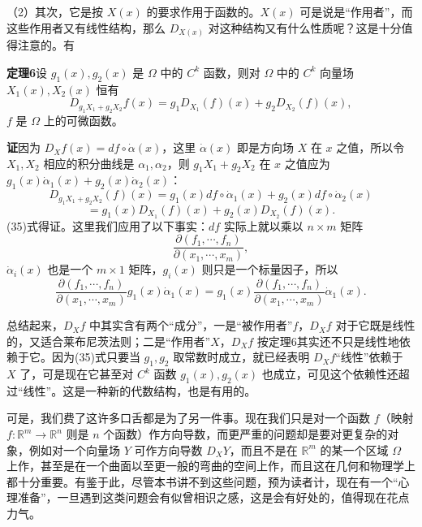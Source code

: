 （2）其次，它是按 $X(x)$ 的要求作用于函数的。$X(x)$ 可是说是“作用者”，而这些作用者又有线性结构，那么 $D_{X(x)}$ 对这种结构又有什么性质呢？这是十分值得注意的。有

\noindent\textbf{定理6}\quad 设 $g_1(x),g_2(x)$ 是 $\Omega$ 中的 $C^k$ 函数，则对 $\Omega$ 中的 $C^k$ 向量场 $X_1(x),X_2(x)$ 恒有
\begin{equation}
 D_{g_1X_1+g_2X_2}f(x)=g_1D_{X_1}(f)(x)+g_2D_{X_2}(f)(x),
 \tag{35}
\end{equation}
$f$ 是 $\Omega$ 上的可微函数。

\noindent\textbf{证}\quad 因为 $D_Xf(x)=df\circ\dot\alpha(x)$，这里 $\dot\alpha(x)$ 即是方向场 $X$ 在 $x$ 之值，所以令 $X_1,X_2$ 相应的积分曲线是 $\alpha_1,\alpha_2$，则 $g_1X_1+g_2X_2$ 在 $x$ 之值应为 $g_1(x)\dot\alpha_1(x)+g_2(x)\dot\alpha_2(x)$：
\[
 D_{g_1X_1+g_2X_2}(f)(x)
 =g_1(x)df\circ\dot\alpha_1(x)+g_2(x)df\circ\dot\alpha_2(x)
\]
\[
 =g_1(x)D_{X_1}(f)(x)+g_2(x)D_{X_2}(f)(x).
\]
(35)式得证。这里我们应用了以下事实：$df$ 实际上就以乘以 $n\times m$ 矩阵
\[
 \frac{\partial(f_1,\cdots,f_n)}{\partial(x_1,\cdots,x_m)},
\]
$\dot\alpha_i(x)$ 也是一个 $m\times1$ 矩阵，$g_i(x)$ 则只是一个标量因子，所以
\[
 \frac{\partial(f_1,\cdots,f_n)}{\partial(x_1,\cdots,x_m)}g_1(x)\dot\alpha_1(x)
 =g_1(x)\frac{\partial(f_1,\cdots,f_n)}{\partial(x_1,\cdots,x_m)}\dot\alpha_1(x).
\]

总结起来，$D_Xf$ 中其实含有两个“成分”，一是“被作用者”$f$，$D_Xf$ 对于它既是线性的，又适合莱布尼茨法则；二是“作用者”$X$，$D_Xf$ 按定理6其实还不只是线性地依赖于它。因为(35)式只要当 $g_1,g_2$ 取常数时成立，就已经表明 $D_Xf$“线性”依赖于 $X$ 了，可是现在它甚至对 $C^k$ 函数 $g_1(x),g_2(x)$ 也成立，可见这个依赖性还超过“线性”。这是一种新的代数结构，也是有用的。

可是，我们费了这许多口舌都是为了另一件事。现在我们只是对一个函数 $f$（映射 $f:\mathbb R^m\to\mathbb R^n$ 则是 $n$ 个函数）作方向导数，而更严重的问题却是要对更复杂的对象，例如对一个向量场 $Y$ 可作方向导数 $D_XY$，而且不是在 $\mathbb R^m$ 的某一个区域 $\Omega$ 上作，甚至是在一个曲面以至更一般的弯曲的空间上作，而且这在几何和物理学上都十分重要。有鉴于此，尽管本书讲不到这些问题，预为读者计，现在有一个“心理准备”，一旦遇到这类问题会有似曾相识之感，这是会有好处的，值得现在花点力气。


